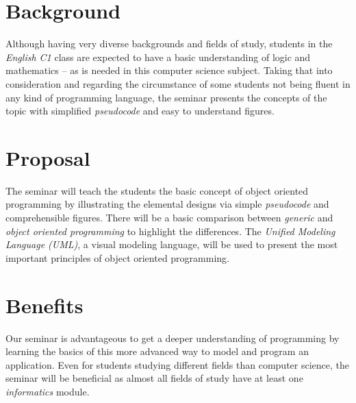 \section*{Background}
Although having very diverse backgrounds and fields of study, students in the \emph{English C1} class are expected to have a basic understanding of logic and mathematics -- as is needed in this computer science subject. Taking that into consideration and regarding the circumstance of some students not being fluent in any kind of programming language, the seminar presents the concepts of the topic with simplified \emph{pseudocode} and easy to understand figures.
\section*{Proposal}
The seminar will teach the students the basic concept of object oriented programming by illustrating the elemental designs via simple \emph{pseudocode} and comprehensible figures. There will be a basic comparison between \emph{generic} and \emph{object oriented programming} to highlight the differences. The \emph{Unified Modeling Language (UML)}, a visual modeling language, will be used to present the most important principles of object oriented programming.
\section*{Benefits}
Our seminar is advantageous to get a deeper understanding of programming by learning the basics of this more advanced way to model and program an application. Even for students studying different fields than computer science, the seminar will be beneficial as almost all fields of study have at least one \emph{informatics} module.


